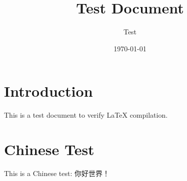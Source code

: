 \documentclass[a4paper,12pt]{article}
\title{Test Document}
\author{Test}
\date{\today}
\begin{document}
\maketitle

\section{Introduction}

This is a test document to verify LaTeX compilation.

\section{Chinese Test}

This is a Chinese test: 你好世界！
\end{document}
